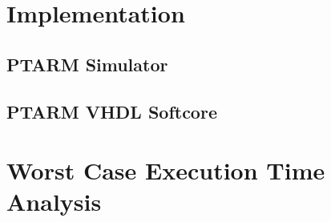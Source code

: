\section{Implementation}
\subsection{PTARM Simulator}
\label{subsection:ptarm_sim}

\subsection{PTARM VHDL Softcore}
\label{subsectio:ptarm_vhdl_softcore}

\section{Worst Case Execution Time Analysis}
\label{sec:wcet}
